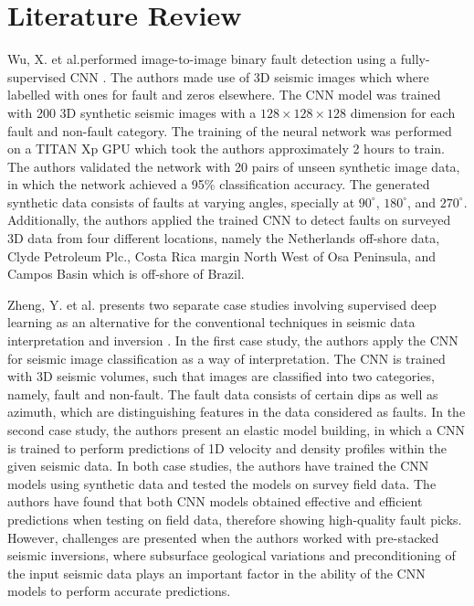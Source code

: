 \documentclass[preprint,12pt]{elsarticle}
\begin{document}
\section{Literature Review}
Wu, X. et al.performed image-to-image binary fault detection using a
fully-supervised CNN \cite{wu2019faultseg3d}. The authors made use of 3D seismic images which
where labelled with ones for fault and zeros elsewhere. The CNN model was
trained with 200 3D synthetic seismic images with a $128\times128\times128$ dimension
for each fault and non-fault category. The training of the neural network was
performed on a TITAN Xp GPU which took the authors approximately 2
hours to train. The authors validated the network with 20 pairs of unseen
synthetic image data, in which the network achieved a 95\% classification
accuracy. The generated synthetic data consists of faults at varying angles,
specially at $90^{\circ}$, $180^{\circ}$, and $270^{\circ}$. Additionally, the authors
applied the trained CNN to detect faults on surveyed 3D data from four different locations,
namely the Netherlands off-shore data, Clyde Petroleum Plc., Costa Rica
margin North West of Osa Peninsula, and Campos Basin which is off-shore
of Brazil.

Zheng, Y. et al. presents two separate case studies involving supervised
deep learning as an alternative for the conventional techniques in seismic
data interpretation and inversion \cite{zheng2019applications}. In the first case study, the authors
apply the CNN for seismic image classification as a way of interpretation.
The CNN is trained with 3D seismic volumes, such that images are classified
into two categories, namely, fault and non-fault. The fault data consists
of certain dips as well as azimuth, which are distinguishing features in the
data considered as faults. In the second case study, the authors present an
elastic model building, in which a CNN is trained to perform predictions
of 1D velocity and density profiles within the given seismic data. In both
case studies, the authors have trained the CNN models using synthetic data
and tested the models on survey field data. The authors have found that
both CNN models obtained effective and efficient predictions when testing
on field data, therefore showing high-quality fault picks. However, challenges
are presented when the authors worked with pre-stacked seismic inversions,
where subsurface geological variations and preconditioning of the input seismic
data plays an important factor in the ability of the CNN models to
perform accurate predictions.
\end{document}
